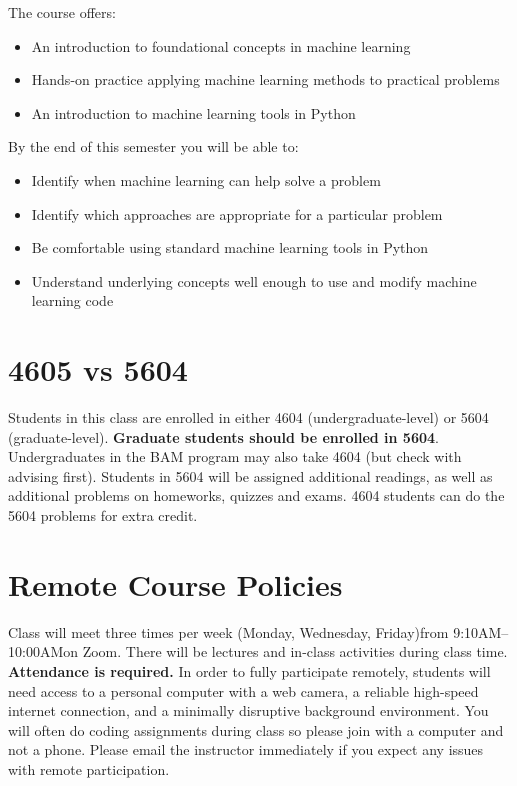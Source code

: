\documentclass[10pt]{memoir}
\def\mymeetingdays{Monday, Wednesday, Friday}
\def\mymeetingtimes{9:10AM--10:00AM}
\begin{document}
The course offers:

\begin{itemize}
\item An introduction to foundational concepts in machine learning
\item Hands-on practice applying machine learning methods to practical problems
\item An introduction to machine learning tools in Python 
\end{itemize}

By the end of this semester you will be able to:
\begin{itemize}
\item Identify when machine learning can help solve a problem
\item Identify which approaches are appropriate for a particular problem
\item Be comfortable using standard machine learning tools in Python
\item Understand underlying concepts well enough to use and modify machine learning code
\end{itemize}

\section{\textbf{4605 vs 5604}}

Students in this class are enrolled in either 4604 (undergraduate-level) or 5604 (graduate-level). \textbf{Graduate students should be enrolled in 5604}. Undergraduates in the BAM program may also take 4604 (but check with advising first).
Students in 5604 will be assigned additional readings, as well as additional problems on homeworks, quizzes and exams.
4604 students can do the 5604 problems for extra credit.

\section{\textbf{Remote Course Policies}}
Class will meet three times per week (\mymeetingdays)\space from \mymeetingtimes\space on Zoom. There will be lectures and in-class activities during class time. \textbf{Attendance is required.} 
In order to fully participate remotely, students will need access to a personal computer with a web camera, a reliable high-speed internet connection, and a minimally disruptive background environment. 
{You will often do coding assignments during class so please join with a computer and not a phone}.
Please email the instructor immediately if you expect any issues with remote participation.
\end{document}
